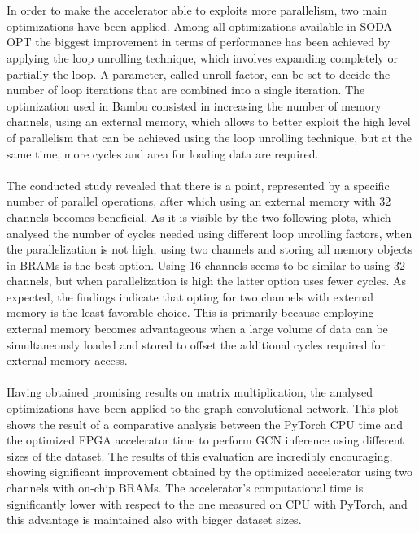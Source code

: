 \documentclass{article}
\begin{document}
\\
\\
\noindent
In order to make the accelerator able to exploits more parallelism, two main optimizations have been applied.
Among all optimizations available in SODA-OPT the biggest improvement in terms of performance has been achieved by applying the loop unrolling technique, which involves expanding completely or partially the loop. A parameter, called unroll factor, can be set to decide the number of loop iterations that are combined into a single iteration. 
The optimization used in Bambu consisted in increasing the number of memory channels, using an external memory, which allows to better exploit the high level of parallelism that can be achieved using the loop unrolling technique, but at the same time, more cycles and area for loading data are required. 
\\
\\
\noindent
The conducted study revealed that there is a point, represented by a specific number of parallel operations, after which using an external memory with 32 channels becomes beneficial.
As it is visible by the two following plots, which analysed the number of cycles needed using different loop unrolling factors, when the parallelization is not high, using two channels and storing all memory objects in BRAMs is the best option. Using 16 channels seems to be similar to using 32 channels, but when parallelization is high the latter option uses fewer cycles. 
As expected, the findings indicate that opting for two channels with external memory is the least favorable choice. This is primarily because employing external memory becomes advantageous when a large volume of data can be simultaneously loaded and stored to offset the additional cycles required for external memory access. 
\\
\\
\noindent
Having obtained promising results on matrix multiplication, the analysed optimizations have been applied to the graph convolutional network.
This plot shows the result of a comparative analysis between the PyTorch CPU time and the optimized FPGA accelerator time to perform GCN inference using different sizes of the dataset. 
The results of this evaluation are incredibly encouraging, showing significant improvement obtained by the optimized accelerator using two channels with on-chip BRAMs. 
The accelerator’s computational time is significantly lower with respect to the one measured on CPU with PyTorch, and this advantage is maintained also with bigger dataset sizes. 
\end{document}
